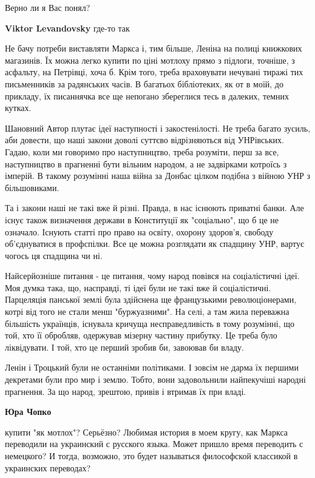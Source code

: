 \begin{itemize}
Верно ли я Вас понял?

\begin{itemize} %
\textbf{Viktor Levandovsky} где-то так
\end{itemize} %


Не бачу потреби виставляти Маркса і, тим більше, Леніна на полиці книжкових
магазинів. Їх можна легко купити по ціні мотлоху прямо з підлоги, точніше, з
асфальту, на Петрівці, хоча б. Крім того, треба враховувати нечувані тиражі тих
письменників за радянських часів. В багатьох бібліотеких, як от в моїй, до
прикладу, їх писаннячка все ще непогано збереглися тесь в далеких, темних
кутках.

Шановний Автор плутає ідеї наступності і закостенілості. Не треба багато
зусиль, аби довести, що наші закони доволі суттєво відрізняються від
УНРівських. Гадаю, коли ми говоримо про наступництво, треба розуміти, перш за
все, наступництво в прагненні бути вільним народом, а не задвірками котроїсь з
імперій. В такому розумінні наша війна за Донбас цілком подібна з війною УНР з
більшовиками.

Та і закони наші не такі вже й різні. Правда, в нас існюють приватні банки. Але
існує також визначення держави в Конституції як "соціально", що б це не
означало. Існують статті про право на освіту, охорону здоров'я, свободу
об'єднуватися в профспілки. Все це можна розглядати як спадщину УНР, вартує
чогось ця спадщина чи ні.

Найсерйозніше питання - це питання, чому народ повівся на соціалістичні ідеї.
Моя думка така, що, насправді, ті ідеї були не такі вже й соціалістичні.
Парцеляція панської землі була здійснена ще французькими революціонерами, котрі
від того не стали менш "буржуазними". На селі, а там жила переважна більшість
українців, існувала кричуща несправедливість в тому розумінні, що той, хто її
обробляв, одержував мізерну частину прибутку. Це треба було ліквідувати. І той,
хто це перший зробив би, завоював би владу.

Ленін і Троцький були не останніми політиками. І зовсім не дарма їх першими
декретами були про мир і землю. Тобто, вони задовольнили найпекучіші народні
прагнення. За що народ, зрештою, привів і втримав їх при владі.

\begin{itemize} %
\textbf{Юра Чопко} 

купити "як мотлох"? Серьёзно? Любимая история в моем кругу, как Маркса
переводили на украинский с русского языка. Может пришло время переводить с
немецкого? И тогда, возможно, это будет называться философской классикой в
украинских переводах?


\end{itemize}
\end{itemize}
